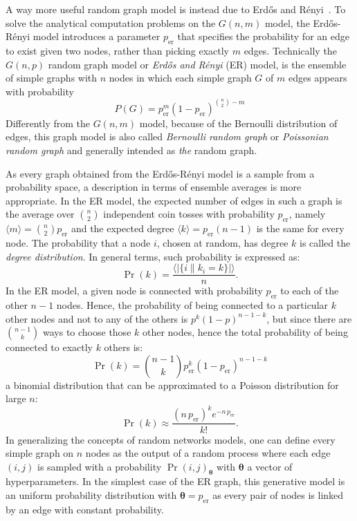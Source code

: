 A way more useful random graph model is instead due to Erd\H{o}s and Rényi~\cite{erdos1959}.
To solve the analytical computation problems on the $G(n,m)$ model, the Erd\H{o}s-Rényi model introduces a parameter $p_{\textrm{er}}$ that specifies the probability for an edge to exist given two nodes, rather than picking exactly $m$ edges.
Technically the $G(n,p)$ random graph model or \emph{Erd\H{o}s and Rényi} (ER) model, is the ensemble of simple graphs with $n$ nodes in which each simple graph $G$ of $m$ edges appears with probability
\begin{equation}
P(G)={p}_{\textrm{er}}^{m}(1-p_{\textrm{er}})^{\binom{n}{2}-m}
\end{equation}
Differently from the $G(n,m)$ model, because of the Bernoulli distribution of edges, this graph model is also called \emph{Bernoulli random graph} or \emph{Poissonian random graph} and generally intended as \emph{the} random graph.

As every graph obtained from the Erd\H{o}s-Rényi model is a sample from a probability space, a description in terms of ensemble averages is more appropriate.
In the ER model, the expected number of edges in such a graph is the average over $\binom{n}{2}$ independent coin tosses with probability $p_{\textrm{er}}$, namely $\langle  m  \rangle = \binom{n}{2}p_{\textrm{er}}$ and the expected degree $\langle  k \rangle = p_{\textrm{er}}(n-1)$ is the same for every node.
The probability that a node $i$, chosen at random, has degree $k$ is called the \emph{degree distribution}.
In general terms, such probability is expressed as:
\begin{equation}
\Pr(k) = \frac{\langle  |\{ i \| k_i=k \}| \rangle }{n}.
\end{equation}
In the ER model, a given node is connected with probability $p_{\textrm{er}}$ to each of the other $n-1$ nodes.
Hence, the probability of being connected to a particular $k$ other nodes and not to any of the others is $p^k(1-p)^{n-1-k}$, but since there are $\binom{n-1}{k}$ ways to choose those $k$ other nodes, hence the total probability of being connected to exactly $k$ others is:
\begin{equation}
\Pr(k) = \binom{n-1}{k}p_{\textrm{er}}^k(1-p_{\textrm{er}})^{n-1-k}
\end{equation}
a binomial distribution that can be approximated to a Poisson distribution for large $n$:
\begin{equation}
\Pr(k) \approx \frac{(n \, p_{\textrm{er}})^k e^{-n \, p_{\textrm{er}}} }{k!}.
\end{equation}
\bigbreak
In generalizing the concepts of random networks models, one can define every simple graph on $n$ nodes as the output of a random process where each edge $(i,j) $ is sampled with a probability $\Pr(i,j)_{ \boldsymbol \theta}$ with $\boldsymbol \theta$ a vector of hyperparameters.
In the simplest case of the ER graph, this generative model is an uniform probability distribution with $\boldsymbol \theta=p_{\textrm{er}}$ as every pair of nodes is linked by an edge with constant probability.

